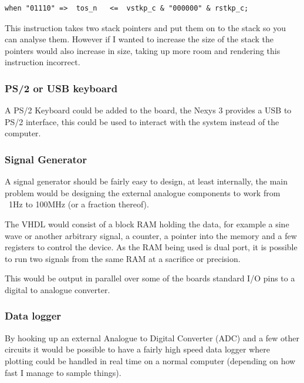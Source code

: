 \documentclass	[a4paper, 10pt]	{article}
\begin{document}
        
\begin{lstlisting}
when "01110" =>  tos_n   <=  vstkp_c & "000000" & rstkp_c; 
\end{lstlisting}

        This instruction takes two stack pointers and put them on to the stack so
        you can analyse them. However if I wanted to increase the size of the
        stack the pointers would also increase in size, taking up more room and
        rendering this instruction incorrect.

      \subsubsection{PS/2 or USB keyboard}

      A PS/2 Keyboard could be added to the board, the Nexys 3 provides a USB
      to PS/2 interface, this could be used to interact with the system instead
      of the computer.

      \subsubsection{Signal Generator}

      A signal generator should be fairly easy to design, at least internally, the
      main problem would be designing the external analogue components to work from
      ~1Hz to 100MHz (or a fraction thereof).

      The VHDL would consist of a block RAM holding the data, for example a sine wave
      or another arbitrary signal, a counter, a pointer into the memory and a few
      registers to control the device. As the RAM being used is dual port, it is
      possible to run two signals from the same RAM at a sacrifice or precision.

      This would be output in parallel over some of the boards standard I/O pins
      to a digital to analogue converter.

      \subsubsection{Data logger}

      By hooking up an external Analogue to Digital Converter (ADC) and a few other
      circuits it would be possible to have a fairly high speed data logger where
      plotting could be handled in real time on a normal computer (depending on how
      fast I manage to sample things).
\end{document}
